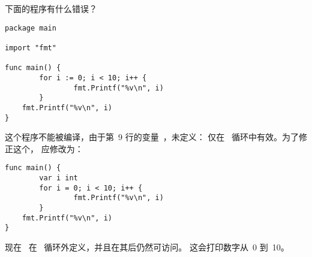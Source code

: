 \begin{Exercise}[title={作用域},difficulty=1]
\label{ex:scope}
\Question\label{ex:scope q1} 下面的程序有什么错误？

\begin{lstlisting}[numbers=right]
package main

import "fmt"
                                                                                                   
func main() {
        for i := 0; i < 10; i++ {
                fmt.Printf("%v\n", i)
        }
	fmt.Printf("%v\n", i)
}
\end{lstlisting}

\end{Exercise}

\begin{Answer}
\Question
这个程序不能被编译，由于第~9 行的变量~，未定义：
 仅在~ 循环中有效。为了修正这个，
 应修改为：
\begin{lstlisting}[numbers=none]
func main() {
        var i int
        for i = 0; i < 10; i++ {
                fmt.Printf("%v\n", i)
        }
	fmt.Printf("%v\n", i)
}
\end{lstlisting}
现在~ 在~ 循环外定义，并且在其后仍然可访问。
这会打印数字从~0 到~10。
\end{Answer}
